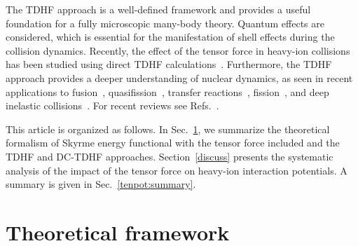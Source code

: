 The TDHF approach is a well-defined framework and provides a useful foundation for a fully microscopic many-body theory.
Quantum effects are considered, which is essential for the manifestation of shell effects during the collision dynamics.
Recently, the effect of the tensor force in heavy-ion collisions has been studied using direct TDHF calculations~\citep{Fracasso2012_PRC86-044303,Dai2014_SciChinaPMA57-1618,Stevenson2016_PRC93-054617,Shi2017_NPR34-41,Guo2018_PLB782-401}.
Furthermore, the TDHF approach provides a deeper understanding of nuclear dynamics, as seen in recent applications to fusion~\citep{Simenel2004_PRL93-102701,Umar2009_PRC80-041601,Oberacker2010_PRC82-034603,Guo2012_EPJWoC38-09003,
	Keser2012_PRC85-044606,Umar2012_PRC85-055801,Simenel2013_PRC88-024617,
	Umar2014_PRC89-034611,Washiyama2015_PRC91-064607,Tohyama2016_PRC93-034607,Godbey2017_PRC95-011601,Simenel2017_PRC95-031601},
quasifission~\citep{Golabek2009_PRL103-042701,Oberacker2014_PRC90-054605,Umar2015_PRC92-024621,Umar2016_PRC94-024605,Yu2017_SciChinaPMA60-092011}, transfer reactions~\citep{Washiyama2009_PRC80-031602,Simenel2010_PRL105-192701,Simenel2011_PRL106-112502,Scamps2013_PRC87-014605,Sekizawa2013_PRC88-014614,
	Wang2016_PLB760-236,Sekizawa2016_PRC93-054616,Sekizawa2017_PRC96-041601},
fission~\citep{Simenel2014_PRC89-031601,Scamps2015_PRC92-011602,Goddard2015_PRC92-054610,Goddard2016_PRC93-014620,Bulgac2016_PRL116-122504,Tanimura2017_PRL118-152501},
and deep inelastic collisions~\citep{Maruhn2006_PRC74-027601,Guo2007_PRC76-014601,Guo2008_PRC77-041301,Iwata2011_PRC84-014616,Dai2014_PRC90-044609,Dai2014_SciChinaPMA57-1618,
	Stevenson2016_PRC93-054617,Guo2017_EPJWoC163-00021,Shi2017_NPR34-41,Umar2017_PRC96-024625}.
For recent reviews see Refs.~\citep{Simenel2012_EPJA48-152,Nakatsukasa2016_RMP88-045004,Simenel2018_PPNP}.

This article is organized as follows. In Sec.~\ref{tenpot:theory}, we summarize the theoretical formalism of Skyrme energy functional with the tensor force included and the TDHF and DC-TDHF approaches.
Section~\ref{discuss} presents the systematic analysis of the impact of the tensor force on heavy-ion interaction potentials.
A summary is given in Sec.~\ref{tenpot:summary}.

\section{Theoretical framework}
\label{tenpot:theory}

